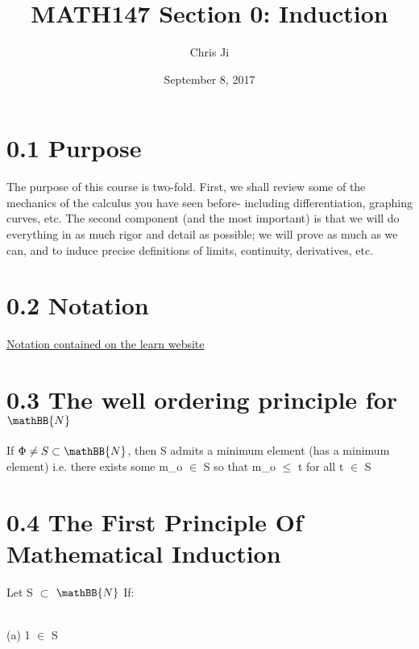\documentclass{article}     %
\title{MATH147 Section 0: Induction}  %
\author{Chris Ji}      %
\date{September 8, 2017}      %
\begin{document}

\maketitle     %

\section*{0.1 Purpose}      %
The purpose of this course is two-fold. First, we shall review some of the mechanics of the calculus you have seen before- including differentiation, graphing curves, etc. The second component (and the most important) is that we will do everything in as much rigor and detail as possible; we will prove as much as we can, and to induce precise definitions of limits, continuity, derivatives, etc. 

\section*{0.2 Notation}
\href{https://learn.uwaterloo.ca/d2l/le/content/335487/viewContent/1934236/View?ou=335487}{Notation contained on the learn website}

\section*{0.3 The well ordering principle for $\mathBB{N}$}
If $\Phi \neq S \subset\mathBB{N}$, then S admits a minimum element (has a minimum element)
i.e. there exists some m_o $\in$ S so that m_o $\leq$ t for all t $\in$ S

\section*{0.4 The First Principle Of Mathematical Induction}
Let S $\subset$ $\mathBB{N}$ If:

\\
(a) 1 $\in$ S
\end{document}
